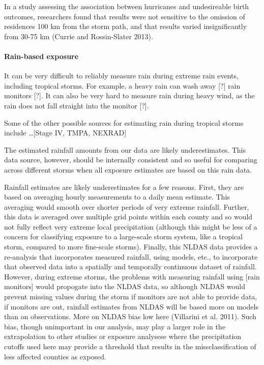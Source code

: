 \documentclass[]{elsarticle} %
\begin{document}
In a study assessing the association between hurricanes and undesireable
birth outcomes, researchers found that results were not sensitive to the
omission of residences 100 km from the storm path, and that results
varied insignificantly from 30-75 km (Currie and Rossin-Slater 2013).

\paragraph{Rain-based exposure}\label{rain-based-exposure-1}

It can be very difficult to reliably measure rain during extreme rain
events, including tropical storms. For example, a heavy rain can wash
away {[}?{]} rain monitors {[}?{]}. It can also be very hard to measure
rain during heavy wind, as the rain does not fall straight into the
monitor {[}?{]}.

Some of the other possible sources for estimating rain during tropical
storms include \ldots{}{[}Stage IV, TMPA, NEXRAD{]}

The estimated rainfall amounts from our data are likely underestimates.
This data source, however, should be internally consistent and so useful
for comparing across different storms when all exposure estimates are
based on this rain data.

Rainfall estimates are likely underestimates for a few reasons. First,
they are based on averaging hourly measurements to a daily mean
estimate. This averaging would smooth over shorter periods of very
extreme rainfall. Further, this data is averaged over multiple grid
points within each county and so would not fully reflect very extreme
local precipitation (although this might be less of a concern for
classifying exposure to a large-scale storm system, like a tropical
storm, compared to more fine-scale storms). Finally, this NLDAS data
provides a re-analysis that incorporates measured rainfall, using
models, etc., to incorporate that observed data into a spatially and
temporally continuous dataset of rainfall. However, during extreme
storms, the problems with measuring rainfall using {[}rain monitors{]}
would propogate into the NLDAS data, so although NLDAS would prevent
missing values during the storm if monitors are not able to provide
data, if monitors are out, rainfall estimates from NLDAS will be based
more on models than on observations. More on NLDAS bias low here
(Villarini et al. 2011). Such bias, though unimportant in our analysis,
may play a larger role in the extrapolation to other studies or exposure
analysese where the precipitation cutoffs used here may provide a
threshold that results in the missclassification of less affected
counties as exposed.
\end{document}
